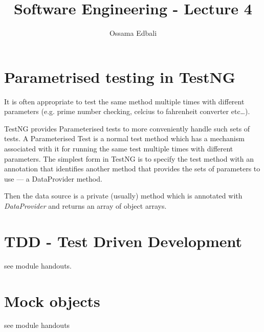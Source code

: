 \documentclass{article}
\title{Software Engineering - Lecture 4}
\author{Ossama Edbali}
\begin{document}
	
	\maketitle	
	
	\section{Parametrised testing in TestNG}	
	It is often appropriate to test the same method multiple times with different parameters (e.g. prime
	number checking, celcius to fahrenheit converter etc\ldots).
	
	TestNG provides Parameterised tests to more conveniently handle such sets of tests.
	A Parameterised Test is a normal test method which has a mechanism associated with it for running the same
	test multiple times with different parameters. The simplest form in TestNG is to specify the test method
	with
	an annotation that identifies another method that provides the sets of parameters to use — a DataProvider
	method.
	
	Then the data source is a private (usually) method which is annotated with \textit{DataProvider} and
	returns an array of object arrays.
	
	\section{TDD - Test Driven Development}
	see module handouts.	
	
	\section{Mock objects}
	see module handouts	
	
\end{document}
